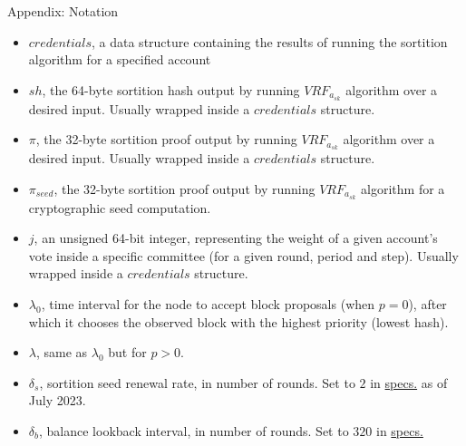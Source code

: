 \documentclass[10pt,a4paper]{article}
\begin{document}
\begin{section}{Appendix: Notation}


\begin{itemize}
    \item $credentials$, a data structure containing the results of running the sortition algorithm 
    for a specified account
    \item $sh$, the 64-byte sortition hash output by running $VRF_{a_{sk}}$ algorithm over a desired input.
    Usually wrapped inside a $credentials$ structure.
    \item $\pi$, the 32-byte sortition proof output by running $VRF_{a_{sk}}$ algorithm over a desired input.
    Usually wrapped inside a $credentials$ structure.
    \item $\pi_{seed}$, the 32-byte sortition proof output by running $VRF_{a_{sk}}$ algorithm for a cryptographic 
    seed computation.
    \item $j$, an unsigned 64-bit integer, representing the weight of a given account's vote inside a specific committee
    (for a given round, period and step).
    Usually wrapped inside a $credentials$ structure.
    \item $\lambda_0$, time interval for the node to accept block proposals (when $p=0$), after which it 
    chooses the observed block with the highest priority (lowest hash).
    \item $\lambda$, same as $\lambda_0$ but for $p > 0$.
    \item $\delta_s$, sortition seed renewal rate, in number of rounds. Set to $2$ in 
    \href{https://github.com/algorandfoundation/specs}{specs.} as of July 2023.
    \item $\delta_b$, balance lookback interval, in number of rounds. Set to $320$ in 
    \href{https://github.com/algorandfoundation/specs}{specs.}


\end{itemize}
\end{section}
\end{document}
